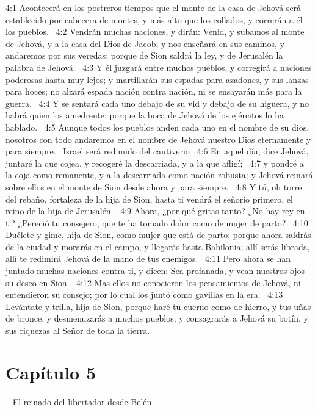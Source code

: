 4:1 Acontecerá en los postreros tiempos que el monte de la casa de Jehová será establecido por cabecera de montes, y más alto que los collados, y correrán a él los pueblos.  
4:2 Vendrán muchas naciones, y dirán: Venid, y subamos al monte de Jehová, y a la casa del Dios de Jacob; y nos enseñará en sus caminos, y andaremos por sus veredas; porque de Sion saldrá la ley, y de Jerusalén la palabra de Jehová.  
4:3 Y él juzgará entre muchos pueblos, y corregirá a naciones poderosas hasta muy lejos; y martillarán sus espadas para azadones, y sus lanzas para hoces; no alzará espada nación contra nación, ni se ensayarán más para la guerra.  
4:4 Y se sentará cada uno debajo de su vid y debajo de su higuera, y no habrá quien los amedrente; porque la boca de Jehová de los ejércitos lo ha hablado.  
4:5 Aunque todos los pueblos anden cada uno en el nombre de su dios, nosotros con todo andaremos en el nombre de Jehová nuestro Dios eternamente y para siempre.  
Israel será redimido del cautiverio  
4:6 En aquel día, dice Jehová, juntaré la que cojea, y recogeré la descarriada, y a la que afligí;  
4:7 y pondré a la coja como remanente, y a la descarriada como nación robusta; y Jehová reinará sobre ellos en el monte de Sion desde ahora y para siempre.  
4:8 Y tú, oh torre del rebaño, fortaleza de la hija de Sion, hasta ti vendrá el señorío primero, el reino de la hija de Jerusalén.  
4:9 Ahora, ¿por qué gritas tanto? ¿No hay rey en ti? ¿Pereció tu consejero, que te ha tomado dolor como de mujer de parto?  
4:10 Duélete y gime, hija de Sion, como mujer que está de parto; porque ahora saldrás de la ciudad y morarás en el campo, y llegarás hasta Babilonia; allí serás librada, allí te redimirá Jehová de la mano de tus enemigos.  
4:11 Pero ahora se han juntado muchas naciones contra ti, y dicen: Sea profanada, y vean nuestros ojos su deseo en Sion.  
4:12 Mas ellos no conocieron los pensamientos de Jehová, ni entendieron su consejo; por lo cual los juntó como gavillas en la era.  
4:13 Levántate y trilla, hija de Sion, porque haré tu cuerno como de hierro, y tus uñas de bronce, y desmenuzarás a muchos pueblos; y consagrarás a Jehová su botín, y sus riquezas al Señor de toda la tierra.  
\section*{Capítulo 5} 
El reinado del libertador desde Belén  

